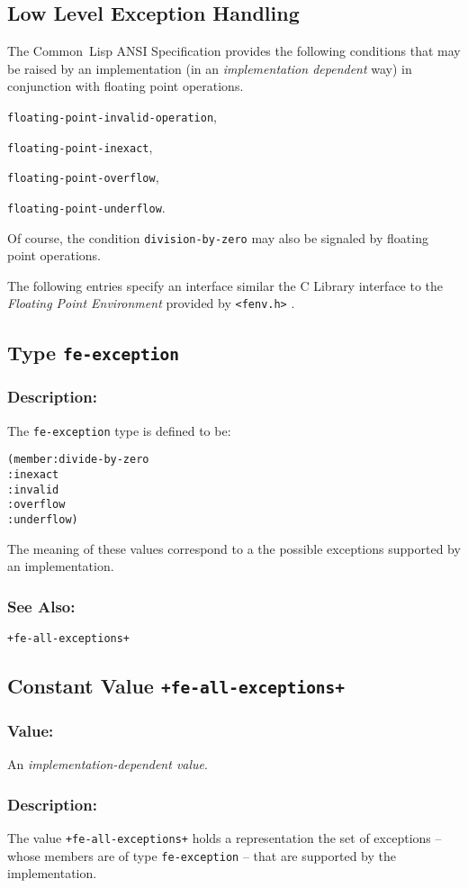 \documentclass[fleqn]{article}
\newcommand{\CL}{\textsf{Common~Lisp}}
\newcommand{\code}[1]{\texttt{#1}}
\newcommand{\DDictionaryItem}[1]{\vspace*{6pt}\noindent\hrulefill\vspace*{-9pt}\subsection*{#1}}
\newcommand{\DDescription}{\subsubsection*{Description:}}
\newcommand{\DSeeAlso}{\subsubsection*{See Also:}}
\begin{document}
\subsection{Low Level Exception Handling}

The \CL{} ANSI Specification provides the following conditions that
may be raised by an implementation (in an \emph{implementation
  dependent} way) in conjunction with floating point operations.
\begin{description}
\item \code{floating-point-invalid-operation},
\item \code{floating-point-inexact},
\item \code{floating-point-overflow},
\item \code{floating-point-underflow}.
\end{description}
Of course, the condition \code{division-by-zero} may also be signaled by floating
point operations.


The following entries specify an interface similar the C Library
interface to the \emph{Floating Point Environment} provided by
\verb|<fenv.h>| \cite{C18}.


\DDictionaryItem{Type \code{fe-exception}}

\DDescription{}

The \code{fe-exception} type is defined to be:
\begin{alltt}
(member :divide-by-zero
        :inexact
        :invalid
        :overflow
        :underflow)
\end{alltt}
The meaning of these values correspond to a the possible exceptions
supported by an implementation.

\DSeeAlso{}

\code{+fe-all-exceptions+}



\DDictionaryItem{Constant Value \code{+fe-all-exceptions+}}

\subsubsection*{Value:}

An \emph{implementation-dependent value}.

\subsubsection*{Description:}

The value \code{+fe-all-exceptions+} holds a representation the set of
exceptions -- whose members are of type \code{fe-exception} -- that
are supported by the implementation.
\end{document}
